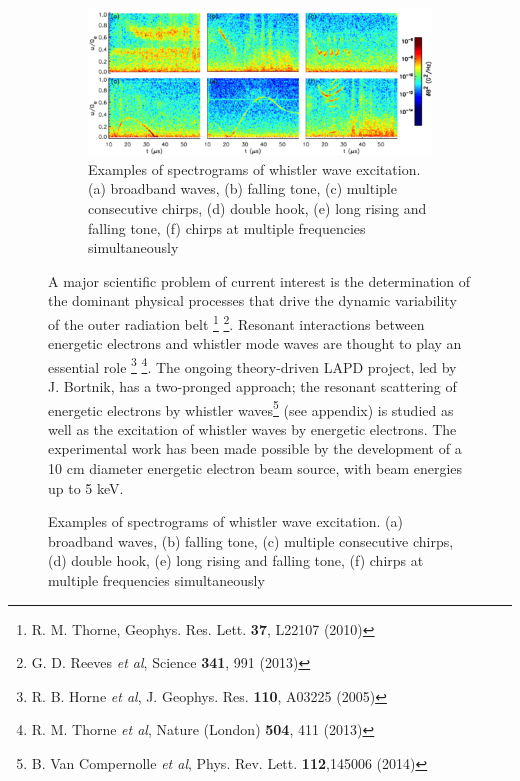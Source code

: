 \documentclass[11pt]{article}
\begin{document}
\begin{description}
\begin{figure}[!htbp]
\begin{figure}[!htbp]
\centerline{\includegraphics[width=3.5truein]{bortnik1}}
\caption{Examples of spectrograms of whistler wave excitation. (a)
  broadband waves, (b) falling tone, (c) multiple consecutive chirps,
  (d) double hook, (e) long rising and falling tone, (f) chirps at
  multiple frequencies simultaneously}\label{bortnik1}
\end{figure}

A major scientific problem of current interest is the determination of
the dominant physical processes that drive the dynamic variability of
the outer radiation belt \footnote{R. M. Thorne, Geophys. Res. Lett.
  \textbf{37}, L22107 (2010)} \footnote{G. D. Reeves \emph{et al},
  Science \textbf{341}, 991 (2013)}. Resonant interactions between
energetic electrons and whistler mode waves are thought to play an
essential role \footnote{R. B. Horne \emph{et al}, J. Geophys. Res.
  \textbf{110}, A03225 (2005)} \footnote{R. M. Thorne \emph{et al},
  Nature (London) \textbf{504}, 411 (2013)}. The ongoing theory-driven
LAPD project, led by J. Bortnik, has a two-pronged approach; the
resonant scattering of energetic electrons by whistler waves\footnote{B.
  Van Compernolle \emph{et al}, Phys. Rev. Lett. \textbf{112},145006
  (2014)} (see appendix) is studied as well as the excitation of
whistler waves by energetic electrons. The experimental work has been
made possible by the development of a 10 cm diameter energetic electron
beam source, with beam energies up to 5 keV.


\end{figure}
\end{description}
\end{document}
